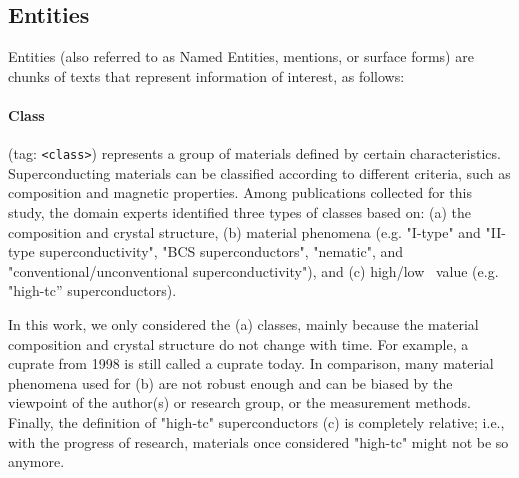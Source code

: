 \subsection{Entities}
Entities (also referred to as Named Entities, mentions, or surface forms) are chunks of texts that represent information of interest, as follows: 

\paragraph{Class} (tag: \texttt{<class>}) represents a group of materials defined by certain characteristics.
Superconducting materials can be classified according to different criteria, such as composition and magnetic properties. 
Among publications collected for this study, the domain experts identified three types of classes based on: (a) the composition and crystal structure, (b) material phenomena (e.g. "I-type" and "II-type superconductivity", "BCS superconductors", "nematic", and "conventional/unconventional superconductivity"), and (c) high/low \tc~value (e.g. "high-tc” superconductors). 

In this work, we only considered the (a) classes, mainly because the material composition and crystal structure do not change with time. For example, a cuprate from 1998 is still called a cuprate today. 
In comparison, many material phenomena used for (b) are not robust enough and can be biased by the viewpoint of the author(s) or research group, or the measurement methods. 
Finally, the definition of "high-tc" superconductors (c) is completely relative; i.e., with the progress of research, materials once considered "high-tc" might not be so anymore.

